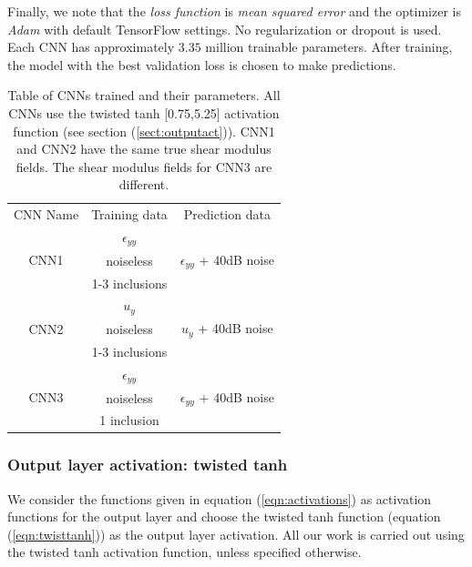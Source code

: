 \documentclass[12pt]{article}
\begin{document}
Finally, we note that the \textit{loss function} is \textit{mean squared error} and the optimizer is \textit{Adam} \cite{misc:kingma2017adam} with default TensorFlow settings. No regularization or dropout is used.  Each CNN has approximately $3.35$ million trainable parameters. After training, the model with the best validation loss is chosen to make predictions.
%
\begin{center}
\begin{table}
  \centering
  \begin{tabular}{|c|c|c|}
    \hline
    \multirow{2}{*}{CNN Name} &  \multirow{2}{*}{Training data}           & \multirow{2}{*}{Prediction data}\\
                              &                                           &  \\
     \hline
     \multirow{3}{*}{CNN1}    &  $\epsilon_{yy}$                           &  \multirow{3}{*}{$\epsilon_{yy}$ + 40dB noise}\\
                              &  noiseless                                & \\
                              &  1-3 inclusions                           &\\
     \hline
     \multirow{3}{*}{CNN2}    &  $u_{y}$                                   & \multirow{3}{*}{$u_{y}$ + 40dB noise}\\
                              &  noiseless                                & \\
                              &  1-3 inclusions                           &\\  
     \hline
     \multirow{3}{*}{CNN3}    &  $\epsilon_{yy}$                           & \multirow{3}{*}{$\epsilon_{yy}$ + 40dB noise}\\
                              &  noiseless                                & \\
                              &  1 inclusion                              & \\

    \hline
  \end{tabular}
  \caption{\label{table:cnnparams} Table of CNNs trained and their parameters. All CNNs use the twisted tanh [0.75,5.25] activation function (see section (\ref{sect:outputact})). CNN1 and CNN2 have the same true shear modulus fields. The shear modulus fields for CNN3 are different.}
\end{table}
\end{center}
%
\subsubsection{\label{sect:outputact} Output layer activation: twisted tanh}
We consider the functions given in equation (\ref{eqn:activations}) as activation functions for the output layer and choose the twisted tanh function (equation (\ref{eqn:twisttanh})) as the output layer activation. All our work is carried out using the twisted tanh activation function, unless specified otherwise.
\end{document}
